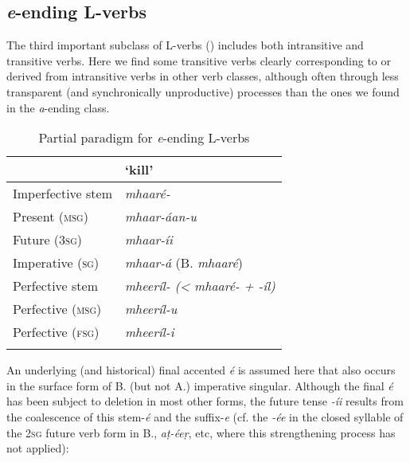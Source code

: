 \subsection{\textit{e}-ending L-verbs}
\label{subsec:8-3-3}


The third important subclass of L-verbs () includes both intransitive and transitive verbs. Here we find some transitive verbs clearly corresponding to or derived from intransitive verbs in other verb classes, although often through less transparent (and synchronically unproductive) processes than the ones we found in the \textit{a}-ending class.


\begin{table}[ht]
\caption{Partial paradigm for \textit{e}-ending L-verbs}
\begin{tabularx}{.75\textwidth}{ Q Q }
\lsptoprule
&
`kill'\\\hline
Imperfective stem &
\textit{mhaaré-}\\
Present (\textsc{msg}) &
\textit{mhaar-áan-u} \\
Future (\textsc{3sg}) &
\textit{mhaar-íi} \\
Imperative (\textsc{sg}) &
\textit{mhaar-á} (B. \textit{mhaaré})\\
Perfective stem &
\textit{mheeríl- ({\textless} mhaaré- + -íl)}\\
Perfective (\textsc{msg}) &
\textit{mheeríl-u} \\
Perfective (\textsc{fsg}) &
\textit{mheeríl-i} \\\lspbottomrule
\end{tabularx}
\label{tab:8-6}
\end{table}


An underlying (and historical) final accented \textit{é} is assumed here that also occurs in the surface form of B. (but not A.) imperative singular. Although the final \textit{é} has been subject to deletion in most other forms, the future tense \textit{-íi} results from the coalescence of this stem-\textit{é} and the suffix-\textit{e} (cf. the \textit{-ée} in the closed syllable of the \textsc{2sg} future verb form in B., \textit{aṭ-éeṛ}, etc, where this strengthening process has not applied):


